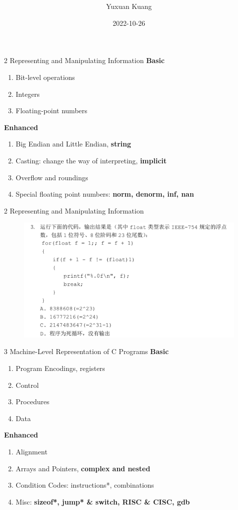 \documentclass{beamer}
\title{\textbf{\topic}}
\author{Yuxuan Kuang}
\institute{School of EECS, PKU}
\date{2022-10-26}
\begin{document}
{ 
\frame{\titlepage}}

\begin{frame}{2 Representing and Manipulating Information}
\textbf{Basic}
\begin{enumerate}
	\item Bit-level operations
	\item Integers
	\item Floating-point numbers
\end{enumerate}
\textbf{Enhanced}
\begin{enumerate}
	\item Big Endian and Little Endian, \textbf{string} %
	\item Casting: change the way of interpreting, \textbf{implicit}
	\item Overflow and roundings
	\item Special floating point numbers: \textbf{norm, denorm, inf, nan}
\end{enumerate}
\end{frame}

\begin{frame}{2 Representing and Manipulating Information}
	\begin{figure}
		\centering
		\includegraphics[width=1.0\textwidth]{figures/2-1.jpeg}
	\end{figure}
\end{frame}


\begin{frame}{3 Machine-Level Representation of C Programs}
\textbf{Basic}
\begin{enumerate}
	\item Program Encodings, registers
	\item Control
	\item Procedures
	\item Data
\end{enumerate}
\textbf{Enhanced}
\begin{enumerate}
	\item Alignment
	\item Arrays and Pointers, \textbf{complex and nested}
	\item Condition Codes: instructions*, combinations
	\item Misc: \textbf{sizeof*, jump* \& switch, RISC \& CISC, gdb}
\end{enumerate}
\end{frame}
\end{document}
